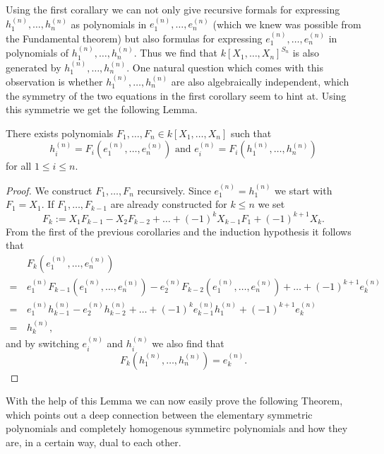 Using the first corallary we can not only give recursive formals for expressing $h^{(n)}_1, \ldots, h^{(n)}_n$ as polynomials in $e^{(n)}_1, \ldots, e^{(n)}_n$ (which we knew was possible from the Fundamental theorem) but also formulas for expressing $e^{(n)}_1, \ldots, e^{(n)}_n$ in polynomials of $h^{(n)}_1, \ldots, h^{(n)}_n$. Thus we find that $k[X_1, \ldots, X_n]^{S_n}$ is also generated by $h^{(n)}_1, \ldots, h^{(n)}_n$. One natural question which comes with this observation is whether $h^{(n)}_1, \ldots, h^{(n)}_n$ are also algebraically independent, which the symmetry of the two equations in the first corollary seem to hint at. Using this symmetrie we get the following Lemma.


\begin{lem}
 There exists polynomials $F_1, \ldots, F_n \in k[X_1, \ldots, X_n]$ such that
 \[
  h^{(n)}_i = F_i\left(e^{(n)}_1, \ldots, e^{(n)}_n\right) \text{ and }
  e^{(n)}_i = F_i\left(h^{(n)}_1, \ldots, h^{(n)}_n\right)
 \]
 for all $1 \leq i \leq n$.
\end{lem}
\begin{proof}
 We construct $F_1, \ldots, F_n$ recursively. Since $e^{(n)}_1 = h^{(n)}_1$ we start with $F_1 = X_1$. If $F_1, \ldots, F_{k-1}$ are already constructed for $k \leq n$ we set
 \[
  F_k := X_1 F_{k-1} - X_2 F_{k-2} + \ldots + (-1)^k X_{k-1} F_1 + (-1)^{k+1} X_k.
 \]
 From the first of the previous corollaries and the induction hypothesis it follows that
 \begin{align*}
   &\, F_k\left(e^{(n)}_1, \ldots, e^{(n)}_n\right) \\
  =&\, e^{(n)}_1 F_{k-1}\left(e^{(n)}_1, \ldots, e^{(n)}_n\right) - e^{(n)}_2 F_{k-2}\left(e^{(n)}_1, \ldots, e^{(n)}_n\right) + \ldots + (-1)^{k+1} e^{(n)}_k \\
  =&\, e^{(n)}_1 h^{(n)}_{k-1} - e^{(n)}_2 h^{(n)}_{k-2} + \ldots + (-1)^k e^{(n)}_{k-1} h^{(n)}_1 + (-1)^{k+1} e^{(n)}_k \\
  =&\, h^{(n)}_k,
 \end{align*}
 and by switching $e^{(n)}_i$ and $h^{(n)}_i$ we also find that
 \[
  F_k\left(h^{(n)}_1, \ldots, h^{(n)}_n\right) = e^{(n)}_k.
 \]
\end{proof}


With the help of this Lemma we can now easily prove the following Theorem, which points out a deep connection between the elementary symmetric polynomials and completely homogenous symmetirc polynomials and how they are, in a certain way, dual to each other.


